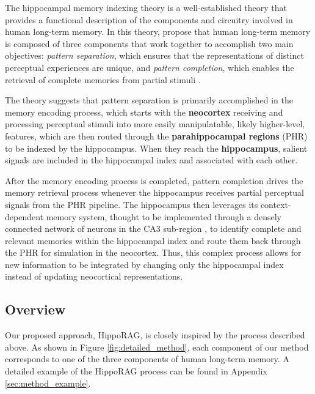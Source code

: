 \documentclass{article}
\begin{document}
The hippocampal memory indexing theory \cite{21Teyler1986TheHM} is a well-established theory that provides a functional description of the components and circuitry involved in human long-term memory.
In this theory, \citet{21Teyler1986TheHM} propose that human long-term memory is composed of three components that work together to accomplish two main objectives: \textit{pattern separation}, which ensures that the representations of distinct perceptual experiences are unique, and \textit{pattern completion}, which enables the retrieval of complete memories from partial stimuli \cite{19Eichenbaum2000ACS,20Teyler2007TheHI}.

The theory suggests that pattern separation is primarily accomplished in the memory encoding process, which starts with the \textbf{neocortex} receiving and processing perceptual stimuli into more easily manipulatable, likely higher-level, features, which are then routed through the \textbf{parahippocampal regions} (PHR) to be indexed by the hippocampus. 
When they reach the \textbf{hippocampus}, salient signals are included in the hippocampal index and associated with each other.

After the memory encoding process is completed, pattern completion drives the memory retrieval process whenever the hippocampus receives partial perceptual signals from the PHR pipeline. 
The hippocampus then leverages its context-dependent memory system, thought to be implemented through a densely connected network of neurons in the CA3 sub-region \cite{20Teyler2007TheHI}, to identify complete and relevant memories within the hippocampal index and route them back through the PHR for simulation in the neocortex. 
Thus, this complex process allows for new information to be integrated by changing only the hippocampal index instead of updating neocortical representations. 

\subsection{Overview}
\label{subsec:method overview}

Our proposed approach, HippoRAG, is closely inspired by the process described above. As shown in Figure \ref{fig:detailed_method}, each component of our method corresponds to one of the three components of human long-term memory. A detailed example of the HippoRAG process can be found in Appendix \ref{sec:method_example}.
\end{document}
